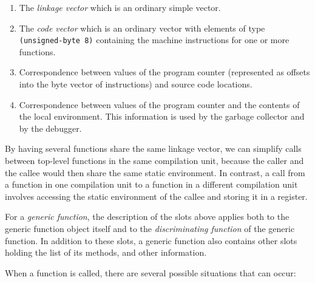 \begin{enumerate}
\item The \emph{linkage vector} which is an ordinary \commonlisp{} simple
  vector.
\item The \emph{code vector} which is an ordinary \commonlisp{} vector with
  elements of type \texttt{(unsigned-byte 8)} containing the machine
  instructions for one or more functions.
\item Correspondence between values of the program counter
  (represented as offsets into the byte vector of instructions) and
  source code locations.
\item Correspondence between values of the program counter and the
  contents of the local environment.  This information is used by the
  garbage collector and by the debugger.
\end{enumerate}

By having several functions share the same linkage vector, we can
simplify calls between top-level functions in the same compilation
unit, because the caller and the callee would then share the
same static environment.  In contrast, a call from a function in one
compilation unit to a function in a different compilation unit
involves accessing the static environment of the callee and storing it
in a register.

For a \emph{generic function}, the description of the slots above
applies both to the generic function object itself and to the
\emph{discriminating function} of the generic function.  In addition
to these slots, a generic function also contains other slots holding
the list of its methods, and other information.

When a function is called, there are several possible situations that
can occur:

